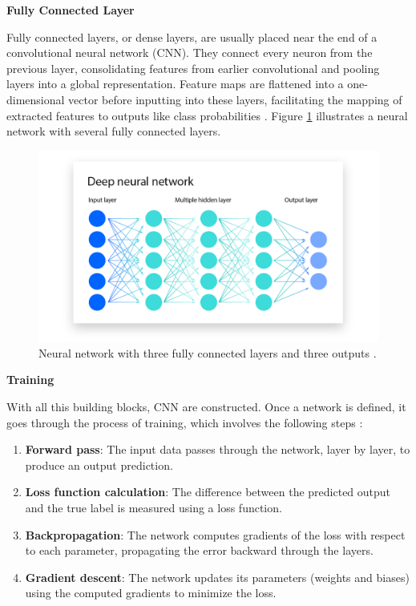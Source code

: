 \documentclass[a4paper,10pt]{book}
\begin{document}
\textbf{Fully Connected Layer}

Fully connected layers, or dense layers, are usually placed near the end of a convolutional neural network (CNN). They connect every neuron from the previous layer, consolidating features from earlier convolutional and pooling layers into a global representation. Feature maps are flattened into a one-dimensional vector before inputting into these layers, facilitating the mapping of extracted features to outputs like class probabilities \cite{noauthor_fully_nodate}. Figure \ref{fig:fc_layers} illustrates a neural network with several fully connected layers.

\begin{figure}[h!]
    \centering
    \includegraphics[width=0.75\linewidth]{reports//assets/fc_network.png}
    \caption[Fully connected layers]{Neural network with three fully connected layers and three outputs \cite{bergmann_what_2024}.}
    \label{fig:fc_layers}
\end{figure}

\textbf{Training}

With all this building blocks, CNN are constructed. Once a network is defined, it goes through the process of training, which involves the following steps \cite{bergmann_what_2024}:

\begin{enumerate}
    \item \textbf{Forward pass}: The input data passes through the network, layer by layer, to produce an output prediction.
    \item \textbf{Loss function calculation}: The difference between the predicted output and the true label is measured using a loss function.
    \item  \textbf{Backpropagation}: The network computes gradients of the loss with respect to each parameter, propagating the error backward through the layers.
    \item \textbf{Gradient descent}: The network updates its parameters (weights and biases) using the computed gradients to minimize the loss.
\end{enumerate}
\end{document}
